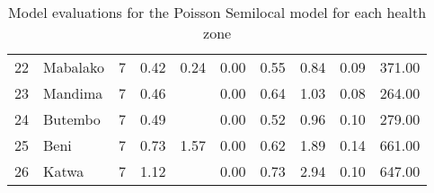 \begin{table}[ht]
\begin{tabular}{rlrrrrrrrr}
  22 & Mabalako &   7 & 0.42 & 0.24 & 0.00 & 0.55 & 0.84 & 0.09 & 371.00 \\ 
  23 & Mandima &   7 & 0.46 &  & 0.00 & 0.64 & 1.03 & 0.08 & 264.00 \\ 
  24 & Butembo &   7 & 0.49 &  & 0.00 & 0.52 & 0.96 & 0.10 & 279.00 \\ 
  25 & Beni &   7 & 0.73 & 1.57 & 0.00 & 0.62 & 1.89 & 0.14 & 661.00 \\ 
  26 & Katwa &   7 & 1.12 &  & 0.00 & 0.73 & 2.94 & 0.10 & 647.00 \\ 
   \hline
\end{tabular}
\caption{Model evaluations for the Poisson Semilocal model for each health zone} 
\label{tab:by_hz_evo}
\end{table}

